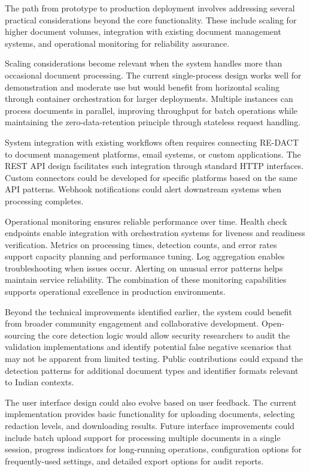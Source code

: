 \bigskip

The path from prototype to production deployment involves addressing several practical considerations beyond the core functionality. These include scaling for higher document volumes, integration with existing document management systems, and operational monitoring for reliability assurance.

Scaling considerations become relevant when the system handles more than occasional document processing. The current single-process design works well for demonstration and moderate use but would benefit from horizontal scaling through container orchestration for larger deployments. Multiple instances can process documents in parallel, improving throughput for batch operations while maintaining the zero-data-retention principle through stateless request handling.

System integration with existing workflows often requires connecting RE-DACT to document management platforms, email systems, or custom applications. The REST API design facilitates such integration through standard HTTP interfaces. Custom connectors could be developed for specific platforms based on the same API patterns. Webhook notifications could alert downstream systems when processing completes.

Operational monitoring ensures reliable performance over time. Health check endpoints enable integration with orchestration systems for liveness and readiness verification. Metrics on processing times, detection counts, and error rates support capacity planning and performance tuning. Log aggregation enables troubleshooting when issues occur. Alerting on unusual error patterns helps maintain service reliability. The combination of these monitoring capabilities supports operational excellence in production environments.

\bigskip

Beyond the technical improvements identified earlier, the system could benefit from broader community engagement and collaborative development. Open-sourcing the core detection logic would allow security researchers to audit the validation implementations and identify potential false negative scenarios that may not be apparent from limited testing. Public contributions could expand the detection patterns for additional document types and identifier formats relevant to Indian contexts.

The user interface design could also evolve based on user feedback. The current implementation provides basic functionality for uploading documents, selecting redaction levels, and downloading results. Future interface improvements could include batch upload support for processing multiple documents in a single session, progress indicators for long-running operations, configuration options for frequently-used settings, and detailed export options for audit reports.

